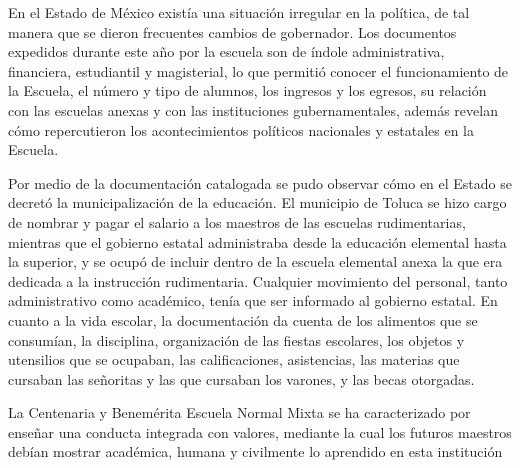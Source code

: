 En el Estado de México existía una situación irregular en la política, de tal 
manera que se dieron frecuentes cambios de gobernador. Los documentos 
expedidos durante este año por la escuela son de índole administrativa, 
financiera, estudiantil y magisterial, lo que permitió conocer el 
funcionamiento de la Escuela, el número y tipo de alumnos, los ingresos 
y los egresos, su relación con las escuelas anexas y con las 
instituciones gubernamentales, además revelan cómo repercutieron los 
acontecimientos políticos nacionales y estatales en la Escuela.

Por medio de la documentación catalogada se pudo observar cómo en el 
Estado se decretó la municipalización de la educación. El municipio de 
Toluca se hizo cargo de nombrar y pagar el salario a los maestros de 
las escuelas rudimentarias, mientras que el gobierno estatal 
administraba desde la educación elemental hasta la superior, y se ocupó de 
incluir dentro de la escuela elemental anexa la que era dedicada a la 
instrucción rudimentaria. Cualquier movimiento del personal, tanto 
administrativo como académico,  tenía que ser informado al gobierno 
estatal. En cuanto a la vida escolar, la documentación da cuenta de los 
alimentos que se consumían, la disciplina, organización de las fiestas 
escolares, los objetos y utensilios que se ocupaban, las 
calificaciones, asistencias, las materias que cursaban las señoritas y 
las que cursaban los varones, y las becas otorgadas.

La Centenaria y Benemérita Escuela Normal Mixta se ha caracterizado por 
enseñar una conducta integrada con valores, mediante la cual  los futuros maestros 
debían mostrar académica, humana y civilmente lo aprendido en esta 
institución
\enlargethispage{1\baselineskip}

